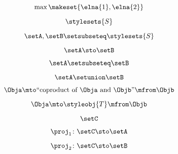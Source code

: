 {\begin{forslides}
        \begin{equation}
            \label{eq:feedback-143}
            \max\makeset{\elna{1},\elna{2}}
        \end{equation}

        \begin{equation}
            \label{eq:feedback-144}
            \stylesets{S}
        \end{equation}

        \begin{equation}
            \label{eq:feedback-145}
            \setA,\setB\setsubseteq \stylesets{S}
        \end{equation}

        \begin{equation}
            \label{eq:feedback-146}
            \setA \sto \setB
        \end{equation}

        \begin{equation}
            \label{eq:feedback-147}
            \setA\setsubseteq \setB
        \end{equation}

        \begin{equation}
            \label{eq:feedback-148}
            \setA\setunion\setB
        \end{equation}

        \begin{equation}
            \label{eq:feedback-149}
            \Obja \mto \text{``coproduct of } \Obja \text{ and } \Objb \text{''}  \mfrom \Objb
        \end{equation}

        \begin{equation}
            \label{eq:feedback-150}
            \Obja \mto \styleobj{T} \mfrom \Objb
        \end{equation}

        \begin{equation}
            \label{eq:feedback-151}
            \setC
        \end{equation}

        \begin{equation}
            \label{eq:feedback-152}
            \proj_1\colon \setC \sto \setA
        \end{equation}

        \begin{equation}
            \label{eq:feedback-153}
            \proj_2\colon \setC \sto \setB
        \end{equation}


\end{forslides}}
